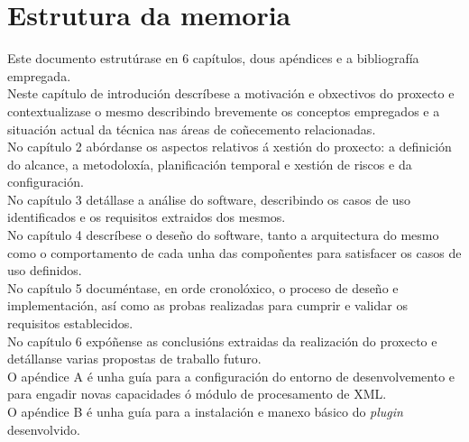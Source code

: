 \section{Estrutura da memoria}

Este documento estrutúrase en 6 capítulos, dous apéndices e a bibliografía empregada.\\

Neste capítulo de introdución descríbese a motivación e obxectivos do proxecto e contextualizase o mesmo describindo brevemente os conceptos empregados e a situación actual da técnica nas áreas de coñecemento relacionadas.\\

No capítulo 2 abórdanse os aspectos relativos á xestión do proxecto: a definición do alcance, a metodoloxía, planificación temporal e xestión de riscos e da configuración.\\

No capítulo 3 detállase a análise do software, describindo os casos de uso identificados e os requisitos extraidos dos mesmos.\\

No capítulo 4 descríbese o deseño do software, tanto a arquitectura do mesmo como o comportamento de cada unha das compoñentes para satisfacer os casos de uso definidos.\\

No capítulo 5 documéntase, en orde cronolóxico, o proceso de deseño e implementación, así como as probas realizadas para cumprir e validar os requisitos establecidos.\\

No capítulo 6 expóñense as conclusións extraidas da realización do proxecto e detállanse varias propostas de traballo futuro.\\

O apéndice A é unha guía para a configuración do entorno de desenvolvemento e para engadir novas capacidades ó módulo de procesamento de XML.\\

O apéndice B é unha guía para a instalación e manexo básico do \emph{plugin} desenvolvido.\\
